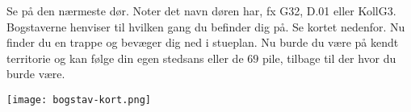 \begin{minipage}[t]{170mm}
Se på den nærmeste dør. Noter det navn døren har, fx G32, D.01 eller KollG3. Bogstaverne henviser til hvilken gang du befinder dig på. Se kortet nedenfor. Nu finder du en trappe og bevæger dig ned i stueplan. Nu burde du være på kendt territorie og kan følge din egen stedsans eller de $69$ pile, tilbage til der hvor du burde være.
\begin{center}
\texttt{[image: bogstav-kort.png]}
\end{center}


\end{minipage}
